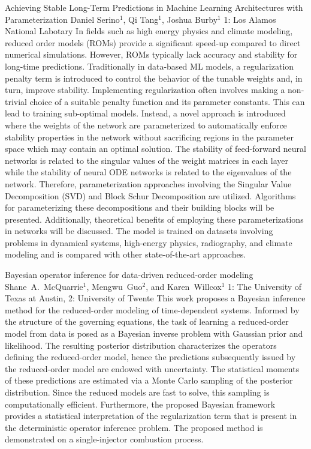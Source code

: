 \vspace{1.5ex}
\abs
{Achieving Stable Long-Term Predictions in Machine Learning Architectures with Parameterization}
{Daniel Serino$^{1}$, Qi Tang$^{1}$, Joshua Burby$^{1}$}
{1: Los Alamos National Labotary}
{In fields such as high energy physics and climate modeling, reduced order models (ROMs) provide a significant speed-up compared to direct numerical simulations. However, ROMs typically lack accuracy and stability for long-time predictions. Traditionally in data-based ML models, a regularization penalty term is introduced to control the behavior of the tunable weights and, in turn, improve stability. Implementing regularization often involves making a non-trivial choice of a suitable penalty function and its parameter constants. This can lead to training sub-optimal models. Instead, a novel approach is introduced where the weights of the network are parameterized to automatically enforce stability properties in the network without sacrificing regions in the parameter space which may contain an optimal solution. The stability of feed-forward neural networks is related to the singular values of the weight matrices in each layer while the stability of neural ODE networks is related to the eigenvalues of the network. Therefore, parameterization approaches involving the Singular Value Decomposition (SVD) and Block Schur Decomposition are utilized. Algorithms for parameterizing these decompositions and their building blocks will be presented. Additionally, theoretical benefits of employing these parameterizations in networks will be discussed. The model is trained on datasets involving problems in dynamical systems, high-energy physics, radiography, and climate modeling and is compared with other state-of-the-art approaches.
}


\vspace{1.5ex}
\abs
{Bayesian operator inference for data-driven reduced-order modeling}
{Shane~A.~McQuarrie$^{1}$, Mengwu~Guo$^{2}$, and Karen~Willcox$^{1}$}
{1: The University of Texas at Austin, 2: University of Twente}
{This work proposes a Bayesian inference method for the reduced-order modeling of time-dependent systems. Informed by the structure of the governing equations, the task of learning a reduced-order model from data is posed as a Bayesian inverse problem with Gaussian prior and likelihood. The resulting posterior distribution characterizes the operators defining the reduced-order model, hence the predictions subsequently issued by the reduced-order model are endowed with uncertainty. The statistical moments of these predictions are estimated via a Monte Carlo sampling of the posterior distribution. Since the reduced models are fast to solve, this sampling is computationally efficient. Furthermore, the proposed Bayesian framework provides a statistical interpretation of the regularization term that is present in the deterministic operator inference problem. The proposed method is demonstrated on a single-injector combustion process.}


